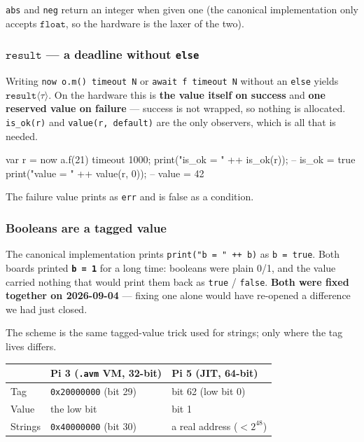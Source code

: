 \documentclass[11pt,a4paper]{article}
\newcommand{\ty}[1]{\ensuremath{\mathtt{#1}}}
\begin{document}
\texttt{abs} and \texttt{neg} return an integer when given one (the canonical
implementation only accepts \ty{float}, so the hardware is the laxer of the two).

\subsubsection*{\ty{result} --- a deadline without \texttt{else}}

Writing \texttt{now o.m() timeout N} or \texttt{await f timeout N} without an
\texttt{else} yields \ty{result}$\langle\tau\rangle$. On the hardware this is
\textbf{the value itself on success} and \textbf{one reserved value on failure} ---
success is not wrapped, so nothing is allocated. \texttt{is\_ok(r)} and
\texttt{value(r, default)} are the only observers, which is all that is needed.

\begin{term}
var r = now a.f(21) timeout 1000;
print("is_ok = " ++ is_ok(r));      -- is_ok = true
print("value = " ++ value(r, 0));   -- value = 42
\end{term}

The failure value prints as \texttt{err} and is false as a condition.

\subsubsection*{Booleans are a tagged value}
\label{sec:bool-tag}

The canonical implementation prints \texttt{print("b = " ++ b)} as
\texttt{b = true}. Both boards printed \textbf{\texttt{b = 1}} for a long time:
booleans were plain 0/1, and the value carried nothing that would print them back
as \texttt{true} / \texttt{false}. \textbf{Both were fixed together on 2026-09-04}
--- fixing one alone would have re-opened a difference we had just closed.

The scheme is the same tagged-value trick used for strings; only where the tag
lives differs.

\begin{center}
\small
\begin{tabular}{@{}lll@{}}
\toprule
 & Pi 3 (\texttt{.avm} VM, 32-bit) & Pi 5 (JIT, 64-bit) \\
\midrule
Tag & \texttt{0x20000000} (bit 29) & bit 62 (low bit 0) \\
Value & the low bit & bit 1 \\
Strings & \texttt{0x40000000} (bit 30) & a real address ($< 2^{48}$) \\
\bottomrule
\end{tabular}
\end{center}
\end{document}
